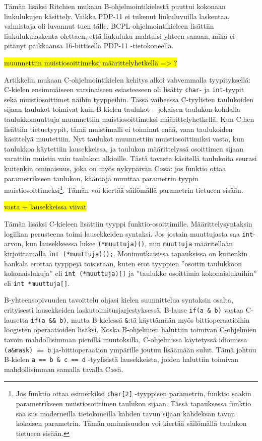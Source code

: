 Tämän lisäksi Ritchien mukaan B-ohjelmointikielestä puuttui kokonaan
liukulukujen käsittely. Vaikka PDP-11 ei tukenut liukuluvuilla laskentaa,
valmistaja oli luvannut tuen tälle. BCPL-ohjelmointikieleen lisättiin
liukulukulaskenta olettaen, että liukuluku mahtuisi yhteen sanaan, mikä ei
pitänyt paikkaansa 16-bittisellä PDP-11 -tietokoneella.

\hl{muunnettiin muistiosoittimeksi määrittelyhetkellä => ?}

Artikkelin mukaan C-ohjelmointikielen kehitys alkoi vahvemmalla tyypityksellä:
C-kielen ensimmäiseen varsinaiseen esiasteeseen oli lisätty \texttt{char}- ja
\texttt{int}-tyypit sekä muistiosoittimet näihin tyyppeihin. Tässä vaiheessa
C-tyylisten taulukoiden sijaan taulukot toimivat kuin B-kielen taulukot --
jokaisen taulukon kohdalla taulukkomuuttuja muunnettiin muistiosoittimeksi
määrittelyhetkellä. Kun C:hen lisättiin tietuetyypit, tämä muistimalli ei
toiminut enää, vaan taulukoiden käsittelyä muutettiin. Nyt taulukot muunnettiin
muistiosoittimiksi vasta, kun taulukkoa käytettiin lausekkeissa, ja taulukon
määrittelyssä osoittimen sijaan varattiin muistia vain taulukon alkioille.
Tästä tavasta käsitellä taulukoita seurasi kuitenkin ominaisuus, joka on myös
nykypäivän C:ssä: jos funktio ottaa parametrikseen taulukon, kääntäjä muuttaa
parametrin tyypin muistiosoittimeksi\footnote{Jos funktio ottaa esimerkiksi
\texttt{char[2]} -tyyppisen parametrin, funktio saakin parametrikseen
muistiosoittimen taulukon sijaan. Tässä tapauksessa funktio saa siis
moderneilla tietokoneilla kahden tavun sijaan kahdeksan tavun kokoisen
parametrin. Tämän ominaisuuden voi kiertää säilömällä taulukon tietueen
sisään.}. Tämän voi kiertää säilömällä parametrin tietueen sisään.

\hl{vasta + lausekkeissa viivat}

Tämän lisäksi C-kieleen lisättiin tyyppi funktio-osoittimille.
Määrittelysyntaksin logiikan perusteena toimi lausekkeiden syntaksi. Jos
jostain muuttujasta saa \texttt{int}-arvon, kun lausekkeessa lukee
\texttt{(*muuttuja)()}, niin \texttt{muuttuja} määritellään kirjoittamalla
\texttt{int~(*muuttuja)();}. Monimutkaisissa tapauksissa on kuitenkin hankala
erottaa tyyppejä toisistaan, kuten erot tyyppien ''osoitin taulukkoon
kokonaislukuja'' eli \texttt{int~(*muuttuja)[]} ja ''taulukko osoittimia
kokonaislukuihin'' eli \texttt{int~*muuttuja[]}.

B-yhteensopivuuden tavoittelu ohjasi kielen suunnittelua syntaksin osalta,
erityisesti lausekkeiden laskutoimitusjarjestyksessä. B-lause
\texttt{if(a~\&~b)} vastaa C-lausetta \texttt{if(a~\&\&~b)}, mutta B-kielessä
\texttt{\&}:tä käyttämään myös bittioperaatioihin loogisten
operaatioiden lisäksi. Koska B-ohjelmien haluttiin toimivan C-ohjelmien tavoin
mahdollisimman pienillä muutoksilla, C-ohjelmissa käytetyssä idiomissa
\texttt{(a\&mask)~==~b} ja-bittioperaation ympärille joutuu lisäämään sulut.
Tämä johtuu B-kielen \texttt{a == b \& c == d} -tyylisistä lausekkeista, joiden
haluttiin toimivan mahdollisimman samalla tavalla C:ssä.

